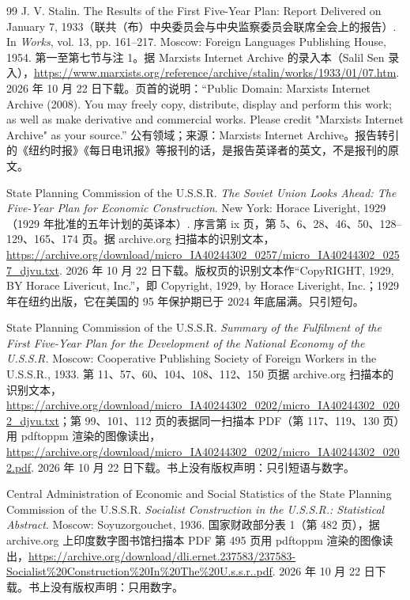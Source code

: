 \begin{thebibliography}{99}
 J. V. Stalin. The Results of the First Five-Year Plan: Report Delivered on January 7, 1933（联共（布）中央委员会与中央监察委员会联席全会上的报告）. In \emph{Works}, vol. 13, pp. 161--217. Moscow: Foreign Languages Publishing House, 1954. 第一至第七节与注 1。据 Marxists Internet Archive 的录入本（Salil Sen 录入），\url{https://www.marxists.org/reference/archive/stalin/works/1933/01/07.htm}. 2026 年 10 月 22 日下载。页首的说明：“Public Domain: Marxists Internet Archive (2008). You may freely copy, distribute, display and perform this work; as well as make derivative and commercial works. Please credit "Marxists Internet Archive" as your source.” 公有领域；来源：Marxists Internet Archive。报告转引的《纽约时报》《每日电讯报》等报刊的话，是报告英译者的英文，不是报刊的原文。

 State Planning Commission of the U.S.S.R. \emph{The Soviet Union Looks Ahead: The Five-Year Plan for Economic Construction}. New York: Horace Liveright, 1929（1929 年批准的五年计划的英译本）. 序言第 ix 页，第 5、6、28、46、50、128--129、165、174 页。据 archive.org 扫描本的识别文本，\url{https://archive.org/download/micro_IA40244302_0257/micro_IA40244302_0257_djvu.txt}. 2026 年 10 月 22 日下载。版权页的识别文本作“CopyRIGHT, 1929, BY Horace Livericut, Inc.”，即 Copyright, 1929, by Horace Liveright, Inc.；1929 年在纽约出版，它在美国的 95 年保护期已于 2024 年底届满。只引短句。

 State Planning Commission of the U.S.S.R. \emph{Summary of the Fulfilment of the First Five-Year Plan for the Development of the National Economy of the U.S.S.R.} Moscow: Cooperative Publishing Society of Foreign Workers in the U.S.S.R., 1933. 第 11、57、60、104、108、112、150 页据 archive.org 扫描本的识别文本，\url{https://archive.org/download/micro_IA40244302_0202/micro_IA40244302_0202_djvu.txt}；第 99、101、112 页的表据同一扫描本 PDF（第 117、119、130 页）用 pdftoppm 渲染的图像读出，\url{https://archive.org/download/micro_IA40244302_0202/micro_IA40244302_0202.pdf}. 2026 年 10 月 22 日下载。书上没有版权声明：只引短语与数字。

 Central Administration of Economic and Social Statistics of the State Planning Commission of the U.S.S.R. \emph{Socialist Construction in the U.S.S.R.: Statistical Abstract}. Moscow: Soyuzorgouchet, 1936. 国家财政部分表 1（第 482 页），据 archive.org 上印度数字图书馆扫描本 PDF 第 495 页用 pdftoppm 渲染的图像读出，\url{https://archive.org/download/dli.ernet.237583/237583-Socialist\%20Construction\%20In\%20The\%20U.s.s.r..pdf}. 2026 年 10 月 22 日下载。书上没有版权声明：只用数字。


\end{thebibliography}
